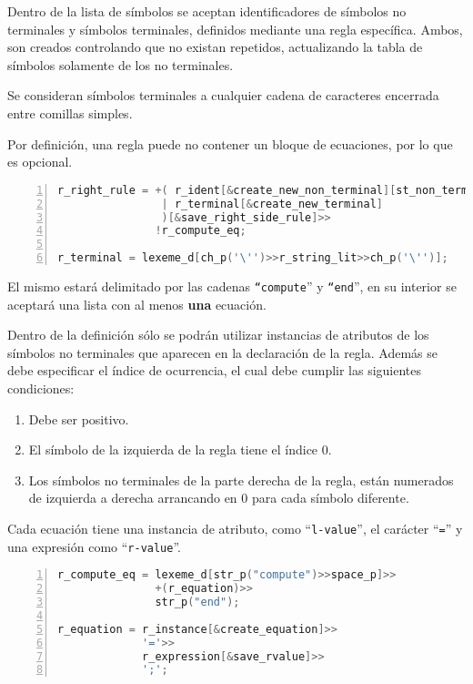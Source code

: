 Dentro de la lista de símbolos se aceptan identificadores de símbolos no terminales y símbolos terminales, definidos mediante una regla específica. Ambos, son creados controlando que no existan repetidos, actualizando la tabla de símbolos solamente de los no terminales.

Se consideran símbolos terminales a cualquier cadena de caracteres encerrada entre comillas simples.

Por definición, una regla puede no contener un bloque de ecuaciones, por lo que es opcional.

\begin{lstlisting}[language=C++, basicstyle=\scriptsize, numbers=left, numbersep=5pt, numberstyle=\tiny]
r_right_rule = +( r_ident[&create_new_non_terminal][st_non_terminal.add]
                | r_terminal[&create_new_terminal]
                )[&save_right_side_rule]>>
               !r_compute_eq;

r_terminal = lexeme_d[ch_p('\'')>>r_string_lit>>ch_p('\'')];
\end{lstlisting}

El mismo estará delimitado por las cadenas \texttt{``compute}'' y \texttt{``end}'', en su interior se aceptará una lista con al menos \textbf{una} ecuación.

Dentro de la definición sólo se podrán utilizar instancias de atributos de los símbolos no terminales que aparecen en la declaración de la regla. Además se debe especificar el índice de ocurrencia, el cual debe cumplir las siguientes condiciones:

\begin{enumerate}
\item Debe ser positivo.
\item El símbolo de la izquierda de la regla tiene el índice 0.
\item Los símbolos no terminales de la parte derecha de la regla, están numerados de izquierda a derecha arrancando en 0 para cada símbolo diferente.
\end{enumerate}

Cada ecuación tiene una instancia de atributo, como ``\texttt{l-value}'', el carácter ``\texttt{=}'' y una expresión como ``\texttt{r-value}''.

\begin{lstlisting}[language=C++, basicstyle=\scriptsize, numbers=left, numbersep=5pt, numberstyle=\tiny]
r_compute_eq = lexeme_d[str_p("compute")>>space_p]>>
               +(r_equation)>>
               str_p("end");

r_equation = r_instance[&create_equation]>>
             '='>>
             r_expression[&save_rvalue]>>
             ';';
\end{lstlisting}

